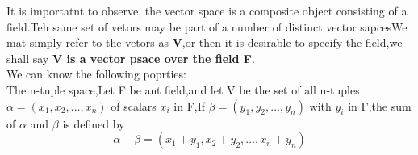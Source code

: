 It is importatnt to observe, the vector space is a composite object consisting of a field.Teh same set of vetors may be part of a number of distinct vector sapcesWe mat simply refer to the vetors as \textbf{V},or then it is desirable to specify the field,we shall say \textbf{V is a vector psace over the field F}.
\\
We can know the following poprties:\\
  The n-tuple space,Let F be ant field,and let V be the set of all n-tuples $\alpha = (x_1,x_2,\dots,x_n)$ of scalars $x_i$ in F,If $\beta = (y_1,y_2,\dots,y_n)$ with $y_i$ in F,the sum of $\alpha$ and $\beta$ is defined by \[
  \alpha + \beta = (x_1+y_1,x_2+y_2,\dots,x_n+y_n)
  \]









